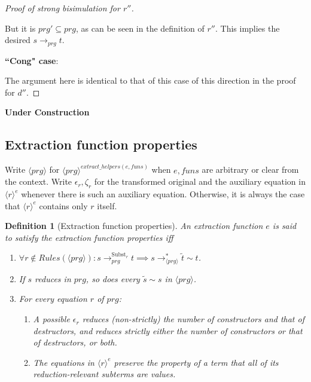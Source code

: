 \documentclass[11pt]{article} %
\newtheorem*{definition*}{Definition}
\begin{document}
\begin{proof}[Proof of strong bisimulation for $r''$]
\begin{enumerate}
But it is $prg' \subseteq prg$, as can be seen in the definition of $r''$. This implies the desired $s \longrightarrow_{prg} t$.
\end{enumerate}

\item \textbf{``Cong" case}:

The argument here is identical to that of this case of this direction in the proof for $d''$.

\end{proof}

\pagebreak
\begin{framed}
\textbf{Under Construction}

\subsection*{Extraction function properties}

Write $\langle prg \rangle$ for $\langle prg \rangle^{extract\_helpers(e, funs)}$ when $e, funs$ are arbitrary or clear from the context. Write $\epsilon_r, \zeta_r$ for the transformed original and the auxiliary equation in $\langle r \rangle^e$ whenever there is such an auxiliary equation. Otherwise, it is always the case that $\langle r \rangle^e$ contains only $r$ itself.

\begin{definition*}[Extraction function properties]
An extraction function $e$ is said to satisfy the extraction function properties iff

\begin{enumerate}
\item $\forall r \not\in Rules(\langle prg \rangle): s \longrightarrow^{\textrm{Subst}_r}_{prg} t \implies s \longrightarrow^*_{\langle prg \rangle} \widetilde{t} \sim t$.

\item If $s$ reduces in $prg$, so does every $\widetilde{s} \sim s$ in $\langle prg \rangle$.

\item For every equation $r$ of $prg$:
\begin{enumerate}
\item A possible $\epsilon_r$ reduces (non-strictly) the number of constructors and that of destructors, and reduces strictly either the number of constructors or that of destructors, or both.

\item The equations in $\langle r \rangle^e$ preserve the property of a term that all of its reduction-relevant subterms are values.
\end{enumerate}


\end{enumerate}
\end{definition*}
\end{framed}
\end{document}
